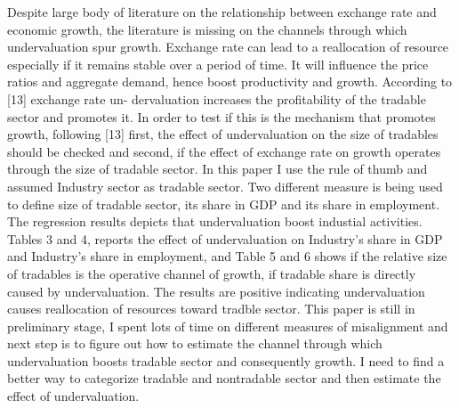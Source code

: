 \documentclass{article}
\begin{document}
Despite large body of literature on the relationship between exchange rate and economic growth, the literature is missing on the channels through which undervaluation spur growth. Exchange rate can lead to a reallocation of resource especially if it remains stable over a period of time. It will influence the price ratios and aggregate demand, hence boost productivity and growth. According to [13] exchange rate un- dervaluation increases the profitability of the tradable sector and promotes it. In order to test if this is the mechanism that promotes growth, following [13] first, the effect of undervaluation on the size of tradables should be checked and second, if the effect of exchange rate on growth operates through the size of tradable sector. In this paper I use the rule of thumb and assumed Industry sector as tradable sector. Two different measure is being used to define size of tradable sector, its share in GDP and its share in employment. The regression results depicts that undervaluation boost industial activities. 
Tables 3 and 4, reports the effect of undervaluation on Industry's share in GDP and Industry's share in employment, and Table 5 and 6 shows if the relative size of tradables is the operative channel of growth, if tradable share is directly caused by undervaluation. The results are positive indicating undervaluation causes reallocation of resources toward tradble sector. This paper is still in preliminary stage, I spent lots of time on different measures of misalignment and next step is to figure out how to estimate the channel through which undervaluation boosts tradable sector and consequently growth. I need to find a better way to categorize tradable and nontradable sector and then estimate the effect of undervaluation.\\ 
\end{document}
